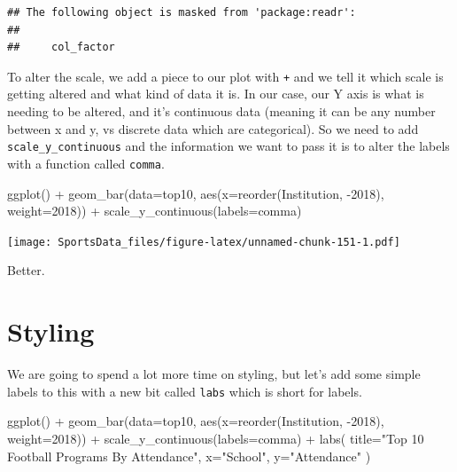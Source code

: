 \documentclass[
]{book}
\newenvironment{Shaded}{\begin{snugshade}}{\end{snugshade}}
\newcommand{\AttributeTok}[1]{\textcolor[rgb]{0.77,0.63,0.00}{#1}}
\newcommand{\FunctionTok}[1]{\textcolor[rgb]{0.00,0.00,0.00}{#1}}
\newcommand{\NormalTok}[1]{#1}
\newcommand{\SpecialCharTok}[1]{\textcolor[rgb]{0.00,0.00,0.00}{#1}}
\newcommand{\StringTok}[1]{\textcolor[rgb]{0.31,0.60,0.02}{#1}}
\begin{document}
\begin{verbatim}
## The following object is masked from 'package:readr':
## 
##     col_factor
\end{verbatim}

To alter the scale, we add a piece to our plot with \texttt{+} and we tell it which scale is getting altered and what kind of data it is. In our case, our Y axis is what is needing to be altered, and it's continuous data (meaning it can be any number between x and y, vs discrete data which are categorical). So we need to add \texttt{scale\_y\_continuous} and the information we want to pass it is to alter the labels with a function called \texttt{comma}.

\begin{Shaded}
\begin{Highlighting}[]
\FunctionTok{ggplot}\NormalTok{() }\SpecialCharTok{+} 
  \FunctionTok{geom\_bar}\NormalTok{(}\AttributeTok{data=}\NormalTok{top10, }\FunctionTok{aes}\NormalTok{(}\AttributeTok{x=}\FunctionTok{reorder}\NormalTok{(Institution, }\SpecialCharTok{{-}}\StringTok{\textasciigrave{}}\AttributeTok{2018}\StringTok{\textasciigrave{}}\NormalTok{), }\AttributeTok{weight=}\StringTok{\textasciigrave{}}\AttributeTok{2018}\StringTok{\textasciigrave{}}\NormalTok{)) }\SpecialCharTok{+} 
  \FunctionTok{scale\_y\_continuous}\NormalTok{(}\AttributeTok{labels=}\NormalTok{comma)}
\end{Highlighting}
\end{Shaded}

\texttt{[image: SportsData\_files/figure-latex/unnamed-chunk-151-1.pdf]}

Better.

\hypertarget{styling}{%
\section{Styling}\label{styling}}

We are going to spend a lot more time on styling, but let's add some simple labels to this with a new bit called \texttt{labs} which is short for labels.

\begin{Shaded}
\begin{Highlighting}[]
\FunctionTok{ggplot}\NormalTok{() }\SpecialCharTok{+} 
  \FunctionTok{geom\_bar}\NormalTok{(}\AttributeTok{data=}\NormalTok{top10, }\FunctionTok{aes}\NormalTok{(}\AttributeTok{x=}\FunctionTok{reorder}\NormalTok{(Institution, }\SpecialCharTok{{-}}\StringTok{\textasciigrave{}}\AttributeTok{2018}\StringTok{\textasciigrave{}}\NormalTok{), }\AttributeTok{weight=}\StringTok{\textasciigrave{}}\AttributeTok{2018}\StringTok{\textasciigrave{}}\NormalTok{)) }\SpecialCharTok{+} 
  \FunctionTok{scale\_y\_continuous}\NormalTok{(}\AttributeTok{labels=}\NormalTok{comma) }\SpecialCharTok{+} 
  \FunctionTok{labs}\NormalTok{(}
    \AttributeTok{title=}\StringTok{"Top 10 Football Programs By Attendance"}\NormalTok{, }
    \AttributeTok{x=}\StringTok{"School"}\NormalTok{, }
    \AttributeTok{y=}\StringTok{"Attendance"}
\NormalTok{)}
\end{Highlighting}
\end{Shaded}
\end{document}
